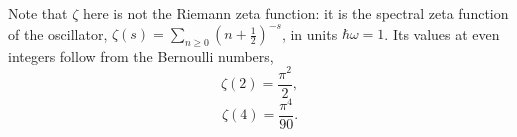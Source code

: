 \documentclass{article}
\begin{document}
Note that $\zeta$ here is not the Riemann zeta function: it is the spectral zeta function
of the oscillator, $\zeta(s)=\sum_{n\ge 0}(n+\tfrac12)^{-s}$, in units $\hbar\omega = 1$.
Its values at even integers follow from the Bernoulli numbers,
\begin{equation}
\zeta(2) = \frac{\pi^2}{2} ,
\label{eq:z2}
\end{equation}
\begin{equation}
\zeta(4) = \frac{\pi^4}{90} .
\label{eq:z4}
\end{equation}
\end{document}
